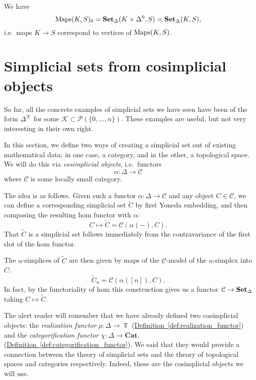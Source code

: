 \documentclass[main.tex]{subfiles}
\begin{document}
\begin{note}
  \label{note:morphisms_are_vertices_of_mapping_space}
  We have
  \begin{equation*}
    \operatorname{Maps}(K, S)_{0} = \operatorname{\mathbf{Set}_{\Delta}}(K \times \Delta^{0}, S) = \operatorname{\mathbf{Set}_{\Delta}}(K, S),
  \end{equation*}
  i.e.\ maps $K \to S$ correspond to vertices of $\operatorname{Maps}(K, S)$.
\end{note}

\section{Simplicial sets from cosimplicial objects}
\label{sec:simplicial_sets_from_cosimplicial_objects}

So far, all the concrete examples of simplicial sets we have seen have been of the form $\Delta^{\mathcal{K}}$ for some $\mathcal{K} \subset \mathcal{P}(\{0, \ldots, n\})$. These examples are useful, but not very interesting in their own right.

In this section, we define two ways of creating a simplicial set out of existing mathematical data; in one case, a category, and in the other, a topological space. We will do this via \emph{cosimplicial objects}, i.e.\ functors
\begin{equation*}
  \alpha\colon \Delta \to \mathcal{C}
\end{equation*}
where $\mathcal{C}$ is some locally small category. 

The idea is as follows. Given such a functor $\alpha\colon \Delta \to \mathcal{C}$ and any object $C \in \mathcal{C}$, we can define a corresponding simplicial set $\tilde{C}$ by first Yoneda embedding, and then composing the resulting hom functor with $\alpha$:
\begin{equation*}
  C \mapsto \tilde{C} = \mathcal{C}(\alpha(-), C).
\end{equation*}
That $\tilde{C}$ is a simplicial set follows immediately from the contravariance of the first slot of the hom functor.

The $n$-simplices of $\tilde{C}$ are then given by maps of the $\mathcal{C}$-model of the $n$-simplex into $C$:
\begin{equation*}
  \tilde{C}_{n} = \mathcal{C}(\alpha([n]), C).
\end{equation*}
In fact, by the functoriality of hom this construction gives us a functor $\mathcal{C} \to \operatorname{\mathbf{Set}_{\Delta}}$ taking $C \mapsto \tilde{C}$.

The alert reader will remember that we have already defined two cosimplicial objects: the \emph{realization functor} $\rho\colon \Delta \to \Top$ (\hyperref[def:realization_functor]{Definition~\ref*{def:realization_functor}}) and the \emph{categorification functor} $\chi\colon \Delta \to \mathbf{Cat}$. (\hyperref[def:categorification_functor]{Definition~\ref*{def:categorification_functor}}). We said that they would provide a connection between the theory of simplicial sets and the theory of topological spaces and categories respectively. Indeed, these are the cosimplicial objects we will use.
\end{document}
